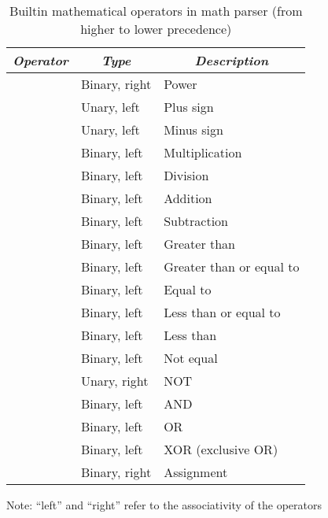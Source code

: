 \begin{table}
	\begin{center}
	\caption{Builtin mathematical operators in math parser
	(from higher to lower precedence)}\label{tab:MATHP-OPERATORS}
	\begin{tabular}{lll}
		\hline
		\multicolumn{1}{c}{\textbf{\emph{Operator}}} & 
		\multicolumn{1}{c}{\textbf{\emph{Type}}} &
		\multicolumn{1}{c}{\textbf{\emph{Description}}} \\
		\hline
		\kw{\^} & Binary, right & Power \\
		\kw{+} & Unary, left & Plus sign \\
		\kw{-} & Unary, left & Minus sign \\
		\kw{*} & Binary, left & Multiplication \\
		\kw{/} & Binary, left & Division \\
		\kw{+} & Binary, left & Addition \\
		\kw{-} & Binary, left & Subtraction \\
		\kw{>} & Binary, left & Greater than \\
		\kw{>=} & Binary, left & Greater than or equal to \\
		\kw{==} & Binary, left & Equal to \\
		\kw{<=} & Binary, left & Less than or equal to \\
		\kw{<} & Binary, left & Less than \\
		\kw{!=} & Binary, left & Not equal \\
		\kw{!} & Unary, right & NOT \\
		\kw{\&\&} & Binary, left & AND \\
		\kw{||} & Binary, left & OR \\
		\kw{{~}|} & Binary, left & XOR (exclusive OR) \\
		\kw{=} & Binary, right & Assignment \\
		\hline
	\end{tabular}
	\end{center}
	\footnotesize
	Note: ``left'' and ``right'' refer to the associativity
	of the operators
\end{table}

